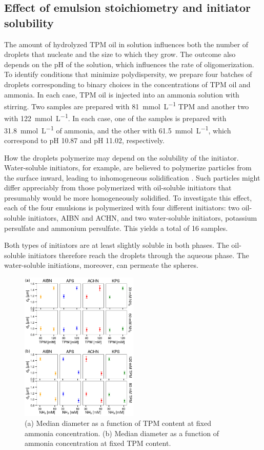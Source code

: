 \documentclass[journal=langd5,manuscript=article]{achemso}
\begin{document}
\subsection{Effect of emulsion stoichiometry and
initiator solubility}
\label{sec:stoichiometry}

The amount of hydrolyzed 
TPM oil in solution influences both
the number of droplets that nucleate and
the size to which they grow.
The outcome also depends on the pH of the solution,
which influences the rate of oligomerization.
To identify conditions that minimize polydispersity,
we prepare four batches of droplets
corresponding to binary choices in the
concentrations of TPM oil and ammonia.
In each case, TPM oil is injected into an ammonia solution
with stirring.
Two samples are prepared with \SI{81}{\milli\mole\per\liter}
TPM and another two with \SI{122}{\milli\mole\per\liter}.
In each case, one of the samples is prepared 
with \SI{31.8}{\milli\mole\per\liter} of ammonia,
and the other with \SI{61.5}{\milli\mole\per\liter}, which
correspond to pH \num{10.87} and pH \num{11.02}, respectively.

How the droplets polymerize may depend on the
solubility of the initiator.
Water-soluble initiators, for example, are believed
to polymerize particles from the surface inward,
leading to inhomogeneous solidification \cite{sacanna11}.
Such particles might differ appreciably from
those polymerized with oil-soluble initiators
that presumably would be more homogeneously solidified.
To investigate this effect, each of the four
emulsions is polymerized with four different initiators:
two oil-soluble initiators, AIBN and ACHN,
and two water-soluble  initiators, potassium persulfate 
and ammonium persulfate.
This yields a total of \num{16} samples.

Both types of initiators are at least slightly soluble in
both phases.  The oil-soluble initiators therefore reach the
droplets through the aqueous phase.  The water-soluble
initiations, moreover, can permeate the spheres.

\begin{figure}[!t]
  \centering
  \includegraphics[width=0.5\textwidth]{longitudinal_summary_02}
  \caption{
    (a) Median diameter as a function of TPM content
    at fixed ammonia concentration.
    (b) Median diameter as a function of ammonia
    concentration at fixed TPM content.}
  \label{fig:choices}
\end{figure}
\end{document}
